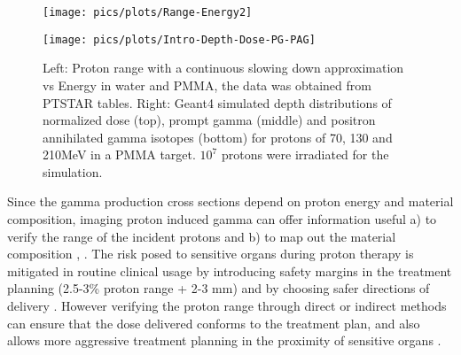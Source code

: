 \documentclass[11pt,a4paper]{article}
\begin{document}
\begin{figure}[h] 
\begin{minipage}[h]{0.36\textwidth}
{\centering\texttt{[image: pics/plots/Range-Energy2]}}
\end{minipage}
\hspace{0.00\linewidth}
\begin{minipage}[h]{0.64\textwidth}
{\centering\texttt{[image: pics/plots/Intro-Depth-Dose-PG-PAG]}}
\end{minipage}
\caption{Left: Proton range with a continuous slowing down approximation vs Energy in water and PMMA, the data was obtained from PTSTAR tables\cite{PTSTAR}. Right: Geant4 simulated depth distributions of normalized dose (top), prompt gamma (middle) and positron annihilated gamma isotopes (bottom) for protons of 70, 130 and 210MeV in a PMMA target. $\mathrm{10^{7}}$ protons were irradiated for the simulation.}
\label{fig_Intro_Depth}
\end{figure}

Since the gamma production cross sections depend on proton energy and material composition, imaging proton induced gamma can offer information useful a) to verify the range of the incident protons and b) to map out the material composition \cite{RKL1979}, \cite{Dyer1981}. The risk posed to sensitive organs during proton therapy is mitigated in routine clinical usage by introducing safety margins in the treatment planning (2.5-3\% proton range + 2-3 mm) and by choosing safer directions of delivery \cite{Paganetti_Range}. However verifying the proton range through direct or  indirect methods can ensure that the dose delivered conforms to the treatment plan, and also allows more aggressive treatment planning in the proximity of sensitive organs \cite{Krimmer2018}. 

\end{document}
